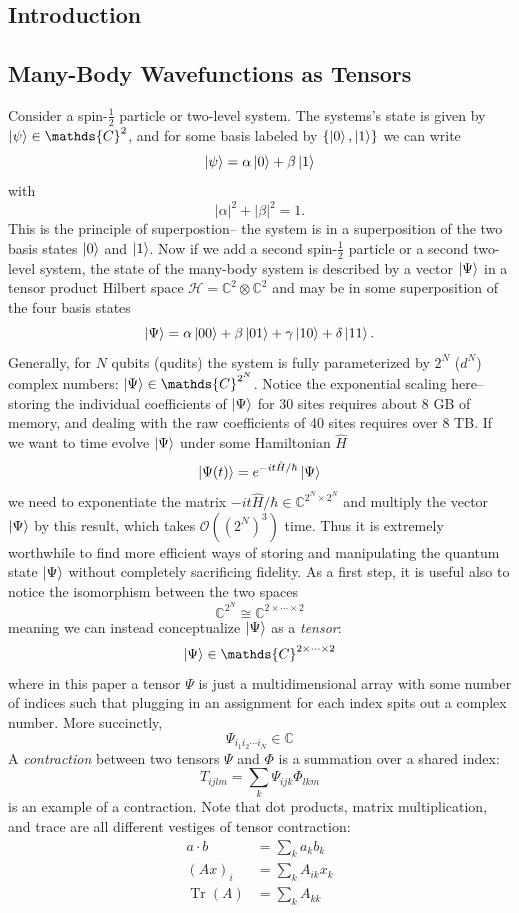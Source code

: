 \documentclass[12pt]{article}
\DeclareMathOperator{\Tr}{Tr}
\begin{document}
\begin{multicols}{2}

\section{Introduction}
	\subsection{Many-Body Wavefunctions as Tensors}
		Consider a spin-$\frac{1}{2}$ particle or two-level system. The systems's state is given by
		$\ket{\psi}\in\mathds{C}^2$, and for some basis labeled by
		$\{\ket{0}, \ket{1}\}$ we can write
		$$\ket{\psi}=\alpha\ket{0}+\beta\ket{1}$$
		with
		$$|\alpha|^2+|\beta|^2=1.$$
		This is the principle of superpostion-- the system
		is in a superposition of the two basis states $\ket{0}$ and $\ket{1}$. Now if we add
		a second spin-$\frac{1}{2}$ particle or a second two-level system, the state of the many-body system
		is described by a vector $\ket{\Psi}$ in a tensor product Hilbert space $\mathcal{H}=\mathds{C}^2\otimes\mathds{C}^2$ and may be in some superposition of the four basis states
		$$\ket{\Psi}=\alpha\ket{00}+\beta\ket{01}+\gamma\ket{10}+\delta\ket{11}.$$
		Generally, for $N$ qubits (qudits) the system is fully
		parameterized by $2^N$ ($d^N$) complex numbers:
		$\ket{\Psi}\in\mathds{C}^{2^N}$. Notice the exponential scaling
		here--
		storing the individual coefficients of $\ket{\Psi}$ for 30 sites
		requires about 8 GB of memory, and dealing with the raw
		coefficients of 40 sites requires over 8 TB.
		If we want to time evolve $\ket{\Psi}$ under some Hamiltonian $\hat{H}$
		$$\ket{\Psi(t)}=e^{-it\hat{H}/\hbar}\ket{\Psi}$$
		we need to exponentiate the matrix $-it\hat{H}/\hbar\in\mathds{C}^{2^N\times2^N}$ and multiply the vector $\ket{\Psi}$ by this result, which takes $\mathcal{O}\left(\left(2^N\right)^3\right)$ time. Thus it is extremely worthwhile to find more efficient ways of storing and manipulating the
		quantum state $\ket{\Psi}$ without completely sacrificing fidelity.
		As a first step, it is useful also to notice the isomorphism between
		the two spaces
		$$\mathds{C}^{2^N}\cong\mathds{C}^{2\times\cdots\times 2}$$
		meaning we can instead conceptualize $\ket{\Psi}$ as a
		\textit{tensor}:
		$$\ket{\Psi}\in\mathds{C}^{2\times\cdots\times2}$$
		where in this paper a tensor $\Psi$ is just a multidimensional
		array with some number of indices such that plugging in an
		assignment for each index spits out a complex number. More
		succinctly,
		$$\Psi_{i_1i_2\cdots i_N}\in\mathds{C}$$
		A \textit{contraction} between two tensors $\Psi$ and $\Phi$ is
		a summation over a shared index:
		$$T_{ijlm}=\sum_k\Psi_{ijk}\Phi_{lkm}$$
		is an example of a contraction. Note that dot products, matrix
		multiplication, and trace are all different vestiges of tensor
		contraction:
				\begin{align*}
				a\cdot b &=\sum_ka_kb_k\\
				(Ax)_{i} &=\sum_kA_{ik}x_k\\
				\Tr(A)&=\sum_kA_{kk}
			\end{align*}



\end{multicols}
\end{document}

